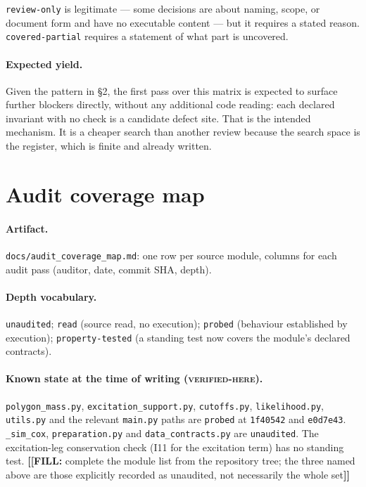 \documentclass[11pt]{article}
\newcommand{\fillanchor}[1]{{\color{red}\textbf{[[FILL:} #1\textbf{]]}}}
\newcommand{\vfy}{\textsc{verified-here}}
\renewcommand{\tt}[1]{\texttt{#1}}
\begin{document}
\noindent\tt{review-only} is legitimate --- some decisions are about naming, scope, or
document form and have no executable content --- but it requires a stated reason.
\tt{covered-partial} requires a statement of what part is uncovered.

\paragraph{Expected yield.} Given the pattern in \S2, the first pass over this matrix is
expected to surface further blockers directly, without any additional code reading: each
declared invariant with no check is a candidate defect site. That is the intended
mechanism. It is a cheaper search than another review because the search space is the
register, which is finite and already written.

\section{Audit coverage map}

\paragraph{Artifact.} \tt{docs/audit\allowbreak{}\_coverage\allowbreak{}\_map.md}: one row per source module, columns
for each audit pass (auditor, date, commit SHA, depth).

\paragraph{Depth vocabulary.} \tt{unaudited}; \tt{read} (source read, no execution);
\tt{probed} (behaviour established by execution); \tt{property-tested} (a standing test
now covers the module's declared contracts).

\paragraph{Known state at the time of writing (\vfy).} \tt{polygon\_mass.py},
\tt{excitation\_support.py}, \tt{cutoffs.py}, \tt{likelihood.py}, \tt{utils.py} and the
relevant \tt{main.py} paths are \tt{probed} at \tt{1f40542} and \tt{e0d7e43}.
\tt{\_sim\_cox}, \tt{preparation.py} and \tt{data\_contracts.py} are \tt{unaudited}. The
excitation-leg conservation check (I11 for the excitation term) has no standing test.
\fillanchor{complete the module list from the repository tree; the three named above are
those explicitly recorded as unaudited, not necessarily the whole set}
\end{document}

